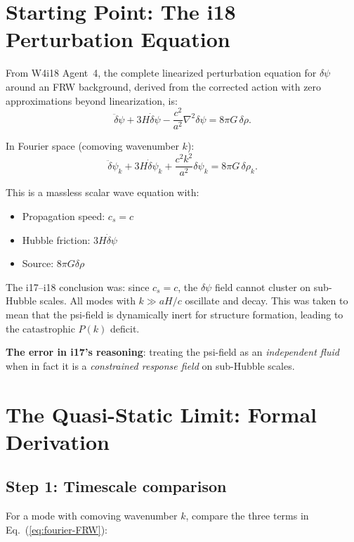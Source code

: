 \documentclass[11pt]{article}
\newcommand{\dpsi}{\delta\psi}
\begin{document}
\section{Starting Point: The i18 Perturbation Equation}

From W4i18 Agent~4, the complete linearized perturbation equation for
$\dpsi$ around an FRW background, derived from the corrected action with
zero approximations beyond linearization, is:
\begin{equation}
\boxed{
\ddot\dpsi + 3H\dot\dpsi - \frac{c^2}{a^2}\nabla^2\dpsi = 8\pi G\,\delta\rho.
}
\label{eq:wave-FRW}
\end{equation}

In Fourier space (comoving wavenumber $k$):
\begin{equation}
\ddot\dpsi_k + 3H\dot\dpsi_k + \frac{c^2 k^2}{a^2}\dpsi_k = 8\pi G\,\delta\rho_k.
\label{eq:fourier-FRW}
\end{equation}

This is a massless scalar wave equation with:
\begin{itemize}[nosep]
\item Propagation speed: $c_s = c$
\item Hubble friction: $3H\dot\dpsi$
\item Source: $8\pi G\delta\rho$
\end{itemize}

The i17--i18 conclusion was: since $c_s = c$, the $\dpsi$ field cannot
cluster on sub-Hubble scales. All modes with $k \gg aH/c$ oscillate
and decay. This was taken to mean that the psi-field is dynamically
inert for structure formation, leading to the catastrophic $P(k)$ deficit.

\textbf{The error in i17's reasoning}: treating the psi-field as an
\emph{independent fluid} when in fact it is a \emph{constrained response
field} on sub-Hubble scales.

\section{The Quasi-Static Limit: Formal Derivation}

\subsection{Step 1: Timescale comparison}

For a mode with comoving wavenumber $k$, compare the three terms
in Eq.~(\ref{eq:fourier-FRW}):
\end{document}
